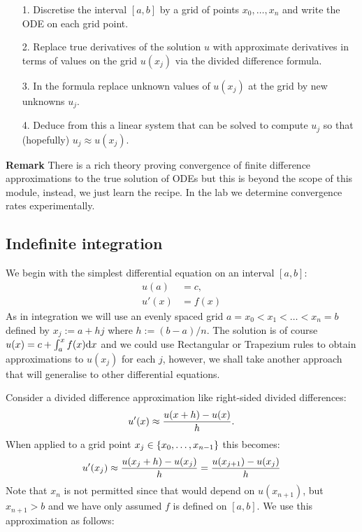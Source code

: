 \begin{itemize}
\item[1. ] Discretise the interval $[a,b]$ by a grid of points $x_0,\ensuremath{\ldots},x_n$ and write the ODE on each grid point.


\item[2. ] Replace true derivatives of the solution $u$ with approximate derivatives in terms of values on the grid $u(x_j)$ via the divided difference formula.


\item[3. ] In the formula replace unknown values of $u(x_j)$ at the grid by new unknowns $u_j$.


\item[4. ] Deduce from this  a linear system that can be solved to compute $u_j$ so that (hopefully) $u_j \ensuremath{\approx} u(x_j)$. 

\end{itemize}
\textbf{Remark} There is a rich theory proving convergence of finite difference approximations to the true solution of ODEs but this is beyond the scope of this module, instead, we just learn the recipe. In the lab we determine convergence rates experimentally.

\subsection{Indefinite integration}
We begin with the simplest differential equation on an interval $[a,b]$:
\begin{align*}
u(a) &= c, \\
u'(x) &= f(x)
\end{align*}
As in integration we will use an evenly spaced grid $a = x_0 < x_1 < \ensuremath{\ldots} < x_n = b$ defined by $x_j :=  a + h j$ where $h := (b-a)/n$. The solution is of course $u(x) = c + \ensuremath{\int}_a^x f(x) {\rm d}x$ and we could use Rectangular or Trapezium rules  to obtain approximations to $u(x_j)$ for each $j$, however, we shall take another approach that will generalise to other differential equations. 

Consider a divided difference approximation like right-sided divided differences: 
\[
u'(x) \ensuremath{\approx} {u(x+h) - u(x)\over h}.
\]
When applied to a grid point $x_j \in \left\{{x_0,\ldots,x_{n-1}}\right\}$ this becomes:
\[
u'(x_j) \ensuremath{\approx} {u(x_j+h) - u(x_j)\over h} = {u(x_{j+1}) - u(x_j)\over h}
\]
Note that $x_n$ is not permitted since that would depend on $u(x_{n+1})$, but $x_{n+1} > b$ and we have only assumed $f$ is defined on $[a,b]$. We use this approximation as follows:

